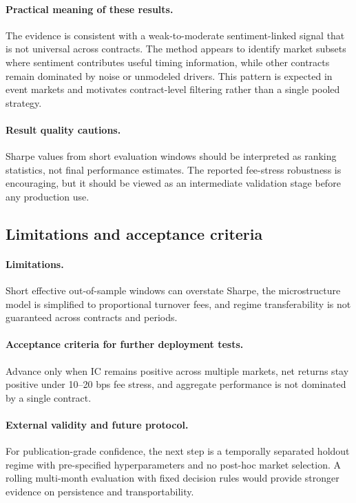 \documentclass[11pt]{article}
\begin{document}
\paragraph{Practical meaning of these results.}
The evidence is consistent with a weak-to-moderate sentiment-linked signal that is not universal across contracts. The method appears to identify market subsets where sentiment contributes useful timing information, while other contracts remain dominated by noise or unmodeled drivers. This pattern is expected in event markets and motivates contract-level filtering rather than a single pooled strategy.
\paragraph{Result quality cautions.}
Sharpe values from short evaluation windows should be interpreted as ranking statistics, not final performance estimates. The reported fee-stress robustness is encouraging, but it should be viewed as an intermediate validation stage before any production use.

\subsection{Limitations and acceptance criteria}
\paragraph{Limitations.}
Short effective out-of-sample windows can overstate Sharpe, the microstructure model is simplified to proportional turnover fees, and regime transferability is not guaranteed across contracts and periods.

\paragraph{Acceptance criteria for further deployment tests.}
Advance only when IC remains positive across multiple markets, net returns stay positive under 10--20 bps fee stress, and aggregate performance is not dominated by a single contract.
\paragraph{External validity and future protocol.}
For publication-grade confidence, the next step is a temporally separated holdout regime with pre-specified hyperparameters and no post-hoc market selection. A rolling multi-month evaluation with fixed decision rules would provide stronger evidence on persistence and transportability.
\end{document}
